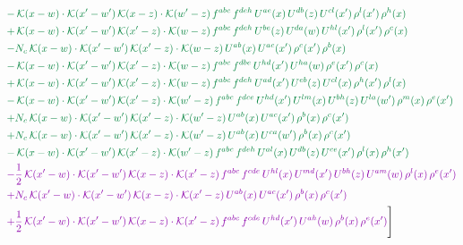 \documentclass[10pt]{article}
\numberwithin{equation}{section}
\begin{document}
\begin{align}
&{\color{JIM} -\,\mathcal{K}(x-w)\cdot\mathcal{K}(x'-w')\,\mathcal{K}(x-z)\cdot\mathcal{K}(w'-z)\,f^{abc}\,f^{deh}\,U^{ae}(x)\,U^{db}(z)\,U^{cl}(x')\,\rho^{l}(x')\,\rho^{h}(x)} \notag\\
&{\color{JIM} +\,\mathcal{K}(x-w)\cdot\mathcal{K}(x'-w')\,\mathcal{K}(x'-z)\cdot\mathcal{K}(w-z)\,f^{abc}\,f^{deh}\,U^{be}(z)\,U^{da}(w)\,U^{hl}(x')\,\rho^{l}(x')\,\rho^{c}(x)} \notag\\
&{\color{JIM} -N_{c}\,\mathcal{K}(x-w)\cdot\mathcal{K}(x'-w')\,\mathcal{K}(x'-z)\cdot\mathcal{K}(w-z)\,U^{ab}(x)\,U^{ac}(x')\,\rho^{c}(x')\,\rho^{b}(x)} \notag\\
&{\color{JIM} -\,\mathcal{K}(x-w)\cdot\mathcal{K}(x'-w')\,\mathcal{K}(x'-z)\cdot\mathcal{K}(w-z)\,f^{abc}\,f^{dbe}\,U^{hd}(x')\,U^{ha}(w)\,\rho^{e}(x')\,\rho^{c}(x)} \notag\\
&{\color{JIM} +\,\mathcal{K}(x-w)\cdot\mathcal{K}(x'-w')\,\mathcal{K}(x'-z)\cdot\mathcal{K}(w-z)\,f^{abc}\,f^{deh}\,U^{ad}(x')\,U^{eb}(z)\,U^{cl}(x)\,\rho^{h}(x')\,\rho^{l}(x)} \notag\\
&{\color{JIM} -\,\mathcal{K}(x-w)\cdot\mathcal{K}(x'-w')\,\mathcal{K}(x'-z)\cdot\mathcal{K}(w'-z)\,f^{abc}\,f^{dce}\,U^{hd}(x')\,U^{lm}(x)\,U^{bh}(z)\,U^{la}(w')\,\rho^{m}(x)\,\rho^{e}(x')} \notag\\
&{\color{JIM} +N_{c}\,\mathcal{K}(x-w)\cdot\mathcal{K}(x'-w')\,\mathcal{K}(x'-z)\cdot\mathcal{K}(w'-z)\,U^{ab}(x)\,U^{ac}(x')\,\rho^{b}(x)\,\rho^{c}(x')} \notag\\
&{\color{JIM} +N_{c}\,\mathcal{K}(x-w)\cdot\mathcal{K}(x'-w')\,\mathcal{K}(x'-z)\cdot\mathcal{K}(w'-z)\,U^{ab}(x)\,U^{ca}(w')\,\rho^{b}(x)\,\rho^{c}(x')} \notag\\
&{\color{JIM} -\,\mathcal{K}(x-w)\cdot\mathcal{K}(x'-w')\,\mathcal{K}(x'-z)\cdot\mathcal{K}(w'-z)\,f^{abc}\,f^{deh}\,U^{al}(x)\,U^{db}(z)\,U^{ce}(x')\,\rho^{l}(x)\,\rho^{h}(x')} \notag\\
&{\color{CC} -\frac{1}{2}\,\mathcal{K}(x'-w)\cdot\mathcal{K}(x'-w')\,\mathcal{K}(x-z)\cdot\mathcal{K}(x'-z)\,f^{abc}\,f^{cde}\,U^{hl}(x)\,U^{md}(x')\,U^{bh}(z)\,U^{am}(w)\,\rho^{l}(x)\,\rho^{e}(x')} \notag\\
&{\color{CC} +N_{c}\,\mathcal{K}(x'-w)\cdot\mathcal{K}(x'-w')\,\mathcal{K}(x-z)\cdot\mathcal{K}(x'-z)\,U^{ab}(x)\,U^{ac}(x')\,\rho^{b}(x)\,\rho^{c}(x')} \notag\\
&{\color{CC} +\frac{1}{2}\,\mathcal{K}(x'-w)\cdot\mathcal{K}(x'-w')\,\mathcal{K}(x-z)\cdot\mathcal{K}(x'-z)\,f^{abc}\,f^{cde}\,U^{hd}(x')\,U^{ah}(w)\,\rho^{b}(x)\,\rho^{e}(x')}\Bigg] \end{align}
\end{document}
